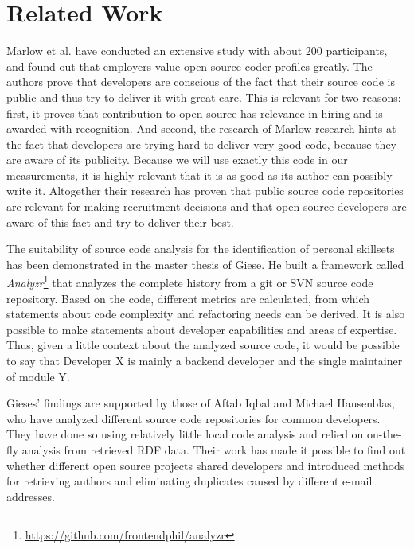 \section{Related Work}
Marlow et al.\cite{md:2013} have conducted an extensive study with about 200 participants, and found out that employers value open source coder profiles greatly.
The authors prove that developers are conscious of the fact that their source code is public and thus try to deliver it with great care. This is relevant for two reasons: first, it proves that contribution to open source has relevance in hiring and is awarded with recognition. And second, the research of Marlow research hints at the fact that developers are trying hard to deliver very good code, because they are aware of its publicity. Because we will use exactly this code in our measurements, it is highly relevant that it is as good as its author can possibly write it. Altogether their research has proven that public source code repositories are relevant for making recruitment decisions and that open source developers are aware of this fact and try to deliver their best.
\newline

The suitability of source code analysis for the identification of personal skillsets has been demonstrated in the master thesis of Giese\cite{pg:2014}. He built a framework called \textit{Analyzr}\footnote{\url{https://github.com/frontendphil/analyzr}} that analyzes the complete history from a git or SVN source code repository. Based on the code, different metrics are calculated, from which statements about code complexity and refactoring needs can be derived. It is also possible to make statements about developer capabilities and areas of expertise. Thus, given a little context about the analyzed source code, it would be possible to say that \glqq Developer X is mainly a backend developer and the single maintainer of module Y\grqq.

Gieses' findings are supported by those of Aftab Iqbal and Michael Hausenblas\cite{ih:2012}, who have analyzed different source code repositories for common developers. They have done so using relatively little local code analysis and relied on on-the-fly analysis from retrieved RDF data. Their work has made it possible to find out whether different open source projects shared developers and introduced methods for retrieving authors and eliminating duplicates caused by different e-mail addresses.
\newline


